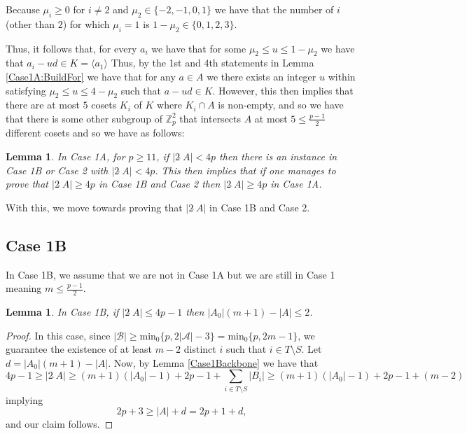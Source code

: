 \documentclass[a4paper, 12pt]{article}\usepackage[english]{babel}
\newtheorem{lem}[thm]{Lemma}
\newcommand{\Z}{\mathbb{Z}}
\newcommand{\minz}{\mathrm{min}_0}
\newcommand{\A}{\mathcal{A}}
\newcommand{\B}{\mathcal{B}}
\newcommand{\<}{\langle}
\let\>\rangle
\begin{document}
Because $\mu_i\geq 0$ for $i\neq 2$ and $\mu_2\in\{-2,-1,0,1\}$ we have that the number of $i$ (other than $2$) for which $\mu_i=1$ is $1-\mu_2\in\{0,1,2,3\}$.

Thus, it follows that, for every $a_i$ we have that for some $\mu_2 \leq u\leq 1-\mu_2$ we have that $a_i-ud\in K=\<a_1\>$ Thus, by the 1st and 4th statements in Lemma \ref{Case1A:BuildFor} we have that for any $a\in A$ we there exists an integer $u$ within satisfying $\mu_2\leq u\leq 4-\mu_2$ such that $a-ud\in K$. However, this then implies that there are at most $5$ cosets $K_i$ of $K$ where $K_i\cap A$ is non-empty, and so we have that there is some other subgroup of $\Z_p^2$ that intersects $A$ at most $5\leq \frac{p-1}{2}$ different cosets and so we have as follows:
\begin{lem}\label{Case1A:Reduction}
    In Case 1A, for $p\geq 11$, if $|2\hat{\;}A|<4p$ then there is an instance in Case 1B or Case 2 with $|2\hat{\;}A|<4p$. This then implies that if one manages to prove that $|2\hat{\;}A|\geq 4p$ in Case 1B and Case 2 then $|2\hat{\;}A|\geq 4p$ in Case 1A.
\end{lem}
With this, we move towards proving that $|2\hat{\;}A|$ in Case 1B and Case 2.



\subsection{Case 1B}


In Case 1B, we assume that we are not in Case 1A but we are still in Case 1 meaning $m\leq \frac{p-1}{2}$.


\begin{lem}\label{Case1B:dbound}
    In Case 1B, if $|2\hat{\;}A|\leq 4p-1$ then $|A_0|(m+1)-|A|\leq 2$.
\end{lem}
\begin{proof}
    In this case, since $|\B|\geq \minz\{p,2|\A|-3\}=\minz\{p,2m-1\}$, we guarantee the existence of at least $m-2$ distinct $i$ such that $i\in T\setminus S$. Let $d=|A_0|(m+1)-|A|$.  Now, by Lemma \ref{Case1Backbone} we have that \[4p-1\geq |2\hat{\;}A|\geq (m+1)(|A_0|-1)+2p-1+\sum_{i\in T\setminus S}|B_i|\geq (m+1)(|A_0|-1)+2p-1+(m-2)\] implying
    \[2p+3\geq |A|+d=2p+1+d,\] and our claim follows.
\end{proof}
\end{document}

